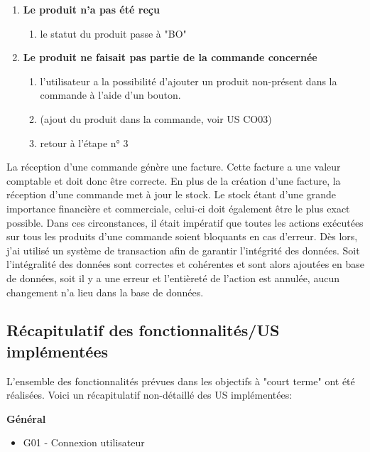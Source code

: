 \begin{enumerate}
  \newpara
  \item \textbf{Le produit n'a pas été reçu}
  \begin{enumerate}
    \item le statut du produit passe à "BO"
  \end{enumerate}

  \newpara
  \item \textbf{Le produit ne faisait pas partie de la commande concernée}
  \begin{enumerate}
    \item l'utilisateur a la possibilité d'ajouter un produit non-présent dans la commande à l'aide d'un bouton.
    \item (ajout du produit dans la commande, voir US CO03)
    \item retour à l'étape n° 3
  \end{enumerate}

\end{enumerate}

\newpara

La réception d'une commande génère une facture. Cette facture a une valeur comptable et doit donc être correcte. En plus de la création d'une facture, la réception d'une commande met à jour le stock. Le stock étant d'une grande importance financière et commerciale, celui-ci doit également être le plus exact possible. Dans ces circonstances, il était impératif que toutes les actions exécutées sur tous les produits d'une commande soient bloquants en cas d'erreur. Dès lors, j'ai utilisé un système de transaction afin de garantir l'intégrité des données. Soit l'intégralité des données sont correctes et cohérentes et sont alors ajoutées en base de données, soit il y a une erreur et l'entièreté de l'action est annulée, aucun changement n'a lieu dans la base de données. 

\newpage

\subsection{Récapitulatif des fonctionnalités/US implémentées}
L'ensemble des fonctionnalités prévues dans les objectifs à "court terme" ont été réalisées. Voici un récapitulatif non-détaillé des US implémentées:  

\newpara
\textbf{Général}
\begin{itemize}
  \item \checkmark G01 - Connexion utilisateur
\end{itemize}

